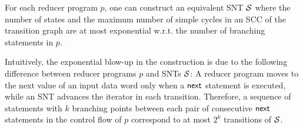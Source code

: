 \vspace{-12mm}


\begin{proposition}\label{prop-mrprog-to-snt}
For each reducer program $p$, one can construct an equivalent SNT ${\mathcal{S} }$ where the number of states and the maximum number of simple cycles in an SCC of the transition graph are at most exponential w.r.t. the number of branching statements in $p$. 
\end{proposition}
Intuitively, the exponential blow-up in the construction is due to the following difference between reducer programs $p$ and SNTs ${\mathcal{S} }$: A reducer program moves to the next value of an input data word only when a $\mathsf{next}$ statement is executed, while an SNT advances the iterator in each transition. Therefore, a sequence of statements with $k$ branching points between each pair of consecutive $\mathsf{next}$ statements in the control flow of $p$ correspond to at most $2^k$ transitions of ${\mathcal{S} }$.



%
%
%




